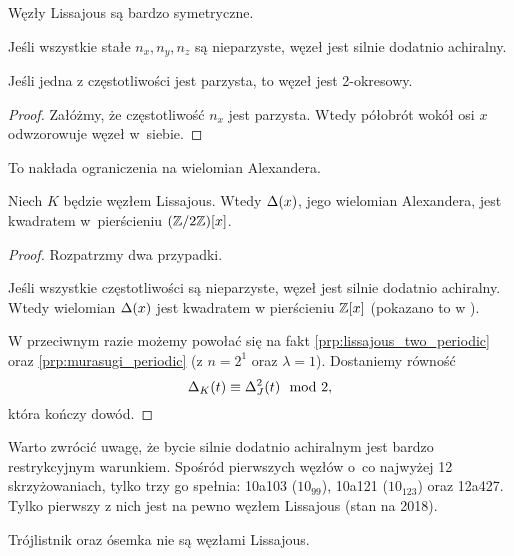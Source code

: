 Węzły Lissajous są bardzo symetryczne.

\begin{proposition}
    Jeśli wszystkie stałe $n_x, n_y, n_z$ są nieparzyste, węzeł jest silnie dodatnio achiralny.
\end{proposition}

\begin{proposition}
%
\label{prp:lissajous_two_periodic}%
    Jeśli jedna z częstotliwości jest parzysta, to węzeł jest 2-okresowy.
\end{proposition}

\begin{proof}
    Załóżmy, że częstotliwość $n_x$ jest parzysta.
    Wtedy półobrót wokół osi $x$ odwzorowuje węzeł w~siebie.
\end{proof}

To nakłada ograniczenia na wielomian Alexandera.

\begin{proposition}
\label{prp:lissajous_alexander}%
    Niech $K$ będzie węzłem Lissajous.
    Wtedy $\Delta(x)$, jego wielomian Alexandera, jest kwadratem w~pierścieniu $(\mathbb Z/2\mathbb Z)[x]$.
\end{proposition}

\begin{proof}
    Rozpatrzmy dwa przypadki.

    Jeśli wszystkie częstotliwości są nieparzyste, węzeł jest silnie dodatnio achiralny.
    Wtedy wielomian $\Delta(x)$ jest kwadratem w pierścieniu $\mathbb Z[x]$ (pokazano to w \cite{hartley79}).

    W przeciwnym razie możemy powołać się na fakt \ref{prp:lissajous_two_periodic} oraz \ref{prp:murasugi_periodic} (z $n=2^1$ oraz $\lambda = 1$).
    Dostaniemy równość
    \begin{equation}
        \label{eqn:lissajous_squared}
        \Delta_K(t) \equiv \Delta^2_{J}(t) \mod 2,
    \end{equation}
    która kończy dowód.
\end{proof}

Warto zwrócić uwagę, że bycie silnie dodatnio achiralnym jest bardzo restrykcyjnym warunkiem.
Spośród pierwszych węzłów o~co najwyżej 12 skrzyżowaniach, tylko trzy go spełnia: 10a103 ($10_{99}$), 10a121 ($10_{123}$) oraz 12a427.
Tylko pierwszy z nich jest na pewno węzłem Lissajous (stan na 2018).

\begin{example}
    Trójlistnik oraz ósemka nie są węzłami Lissajous.
\end{example}

